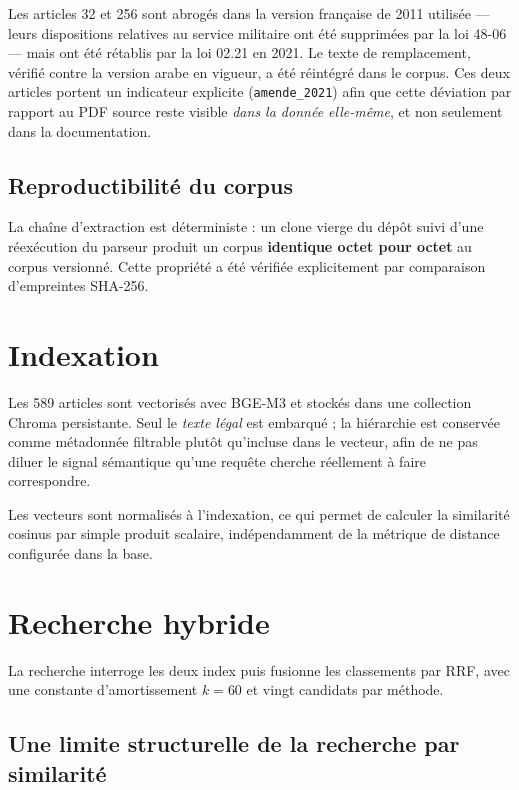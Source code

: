 Les articles 32 et 256 sont abrogés dans la version française de 2011 utilisée --- leurs
dispositions relatives au service militaire ont été supprimées par la loi 48-06 --- mais ont été
rétablis par la loi 02.21 en 2021. Le texte de remplacement, vérifié contre la version arabe en
vigueur, a été réintégré dans le corpus. Ces deux articles portent un indicateur explicite
(\texttt{amende\_2021}) afin que cette déviation par rapport au PDF source reste visible
\emph{dans la donnée elle-même}, et non seulement dans la documentation.

\subsection{Reproductibilité du corpus}

La chaîne d'extraction est déterministe : un clone vierge du dépôt suivi d'une réexécution du
parseur produit un corpus \textbf{identique octet pour octet} au corpus versionné. Cette
propriété a été vérifiée explicitement par comparaison d'empreintes SHA-256.

\section{Indexation}

Les 589 articles sont vectorisés avec BGE-M3 et stockés dans une collection Chroma persistante.
Seul le \emph{texte légal} est embarqué ; la hiérarchie est conservée comme métadonnée filtrable
plutôt qu'incluse dans le vecteur, afin de ne pas diluer le signal sémantique qu'une requête
cherche réellement à faire correspondre.

Les vecteurs sont normalisés à l'indexation, ce qui permet de calculer la similarité cosinus par
simple produit scalaire, indépendamment de la métrique de distance configurée dans la base.

\section{Recherche hybride}

La recherche interroge les deux index puis fusionne les classements par RRF, avec une constante
d'amortissement $k = 60$ et vingt candidats par méthode.

\subsection{Une limite structurelle de la recherche par similarité}

